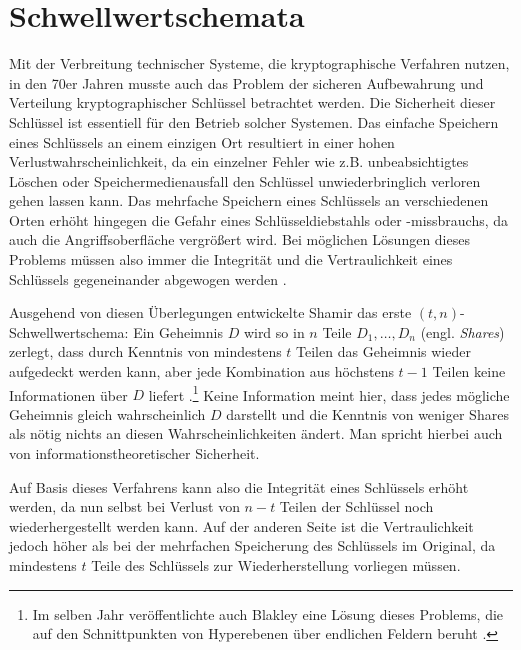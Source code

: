\section{Schwellwertschemata}

\label{sec_basics_threshold}


Mit der Verbreitung technischer Systeme, die kryptographische Verfahren nutzen, in den 70er Jahren musste auch das Problem der sicheren Aufbewahrung und Verteilung kryptographischer Schlüssel betrachtet werden. Die Sicherheit dieser Schlüssel ist essentiell für den Betrieb solcher Systemen. Das einfache Speichern eines Schlüssels an einem einzigen Ort resultiert in einer hohen Verlustwahrscheinlichkeit, da ein einzelner Fehler wie z.B. unbeabsichtigtes Löschen oder Speichermedienausfall den Schlüssel unwiederbringlich verloren gehen lassen kann. Das mehrfache Speichern eines Schlüssels an verschiedenen Orten erhöht hingegen die Gefahr eines Schlüsseldiebstahls oder -missbrauchs, da auch die Angriffsoberfläche vergrößert wird. Bei möglichen Lösungen dieses Problems müssen also immer die Integrität und die Vertraulichkeit eines Schlüssels gegeneinander abgewogen werden \cite{gemmell1997}.

Ausgehend von diesen Überlegungen entwickelte Shamir das erste \((t,n)\)-Schwellwertschema: Ein Geheimnis \(D\) wird so in \(n\) Teile \(D_1, \dots, D_n\) (engl. \textit{Shares}) zerlegt, dass durch Kenntnis von mindestens \(t\) Teilen das Geheimnis wieder aufgedeckt werden kann, aber jede Kombination aus höchstens \(t-1\) Teilen keine Informationen über \(D\) liefert \cite{shamir1979}.\footnote{
  Im selben Jahr veröffentlichte auch Blakley eine Lösung dieses Problems, die auf den Schnittpunkten von Hyperebenen über endlichen Feldern beruht \cite{blakley1979}.
} Keine Information meint hier, dass jedes mögliche Geheimnis gleich wahrscheinlich \(D\) darstellt und die Kenntnis von weniger Shares als nötig nichts an diesen Wahrscheinlichkeiten ändert. Man spricht hierbei auch von informationstheoretischer Sicherheit.

Auf Basis dieses Verfahrens kann also die Integrität eines Schlüssels erhöht werden, da nun selbst bei Verlust von \(n-t\) Teilen der Schlüssel noch wiederhergestellt werden kann. Auf der anderen Seite ist die Vertraulichkeit jedoch höher als bei der mehrfachen Speicherung des Schlüssels im Original, da mindestens \(t\) Teile des Schlüssels zur Wiederherstellung vorliegen müssen.


